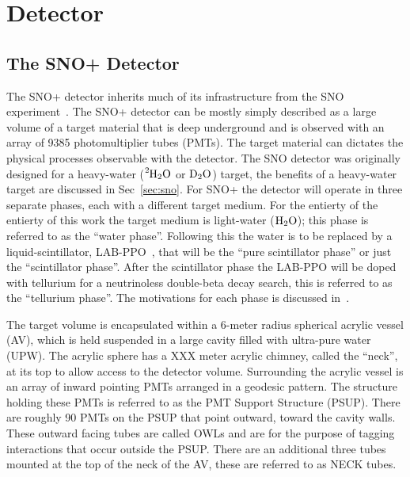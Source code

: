 
\chapter{Detector}

\ifpdf
    \graphicspath{{detector/figures/PNG/}{detector/figures/PDF/}{detector/figures/}}
\else
    \graphicspath{{detector/figures/EPS/}{detector/figures/}}
\fi


\section{The SNO+ Detector}
The SNO+ detector inherits much of its infrastructure from the SNO
experiment~\cite{sno_detector_paper}.
The SNO+ detector can be mostly simply described as a large volume of a
target material that is deep underground and is observed with an array of
9385  photomultiplier tubes (PMTs).
The target material can dictates the physical processes
observable with the detector.
The SNO detector was originally designed for a heavy-water ($\ce{^{2}H_{2}O}$ or $\ce{D_{2}O}$)
target, the benefits of a heavy-water target are discussed in Sec~\ref{sec:sno}.
For SNO+ the detector will operate in three separate phases, each with a different
target medium.
For the entierty of the entierty of  this work the target medium is
light-water ($\ce{H_{2}O}$); this phase is referred to as the ``water phase''.
Following this the water is to be replaced by a liquid-scintillator, LAB-PPO~\cite{mchen_labppo},
that will be the ``pure scintillator phase'' or just the ``scintillator phase''.
After the scintillator phase the LAB-PPO will be doped with tellurium for
a neutrinoless double-beta decay search, this is referred to as the ``tellurium phase''.
The motivations for each phase is discussed in~\cite{snop_status_prospects}.

The target volume is encapsulated within a 6-meter radius spherical acrylic vessel (AV),
which is held suspended in a large cavity filled with ultra-pure water (UPW)\@.
The acrylic sphere has a XXX meter acrylic chimney, called the ``neck'', at its top
to allow access to the detector volume.
Surrounding the acrylic vessel is an  array of inward pointing PMTs
arranged in a geodesic pattern.
The structure holding these PMTs is referred to as the PMT Support Structure
(PSUP).
There are roughly 90 PMTs on the PSUP that point outward, toward the cavity
walls.
These outward facing tubes are called OWLs and are for the purpose of tagging
interactions that occur outside the PSUP\@.
There are an additional three tubes mounted at the top of the neck of the AV,
these are referred to as NECK tubes.

